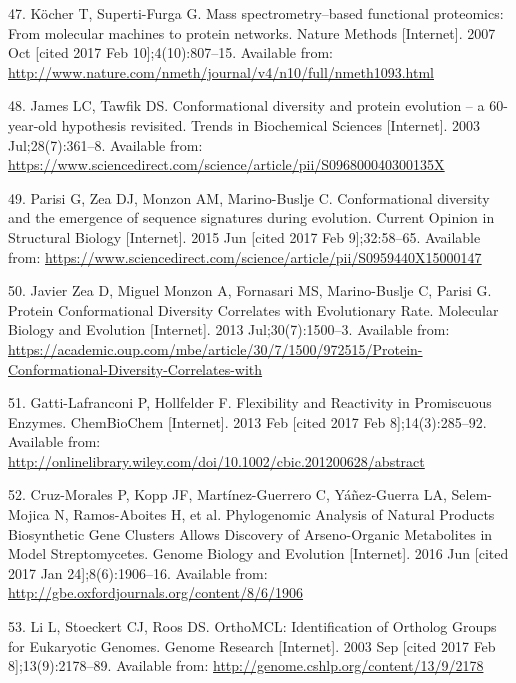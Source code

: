 \documentclass[12pt,twoside]{reedthesis}
\begin{document}
{  \hypertarget{ref-kocher_mass_2007}{}
  47. Köcher T, Superti-Furga G. Mass spectrometry--based functional
  proteomics: From molecular machines to protein networks. Nature Methods
  {[}Internet{]}. 2007 Oct {[}cited 2017 Feb 10{]};4(10):807--15.
  Available from:
  \url{http://www.nature.com/nmeth/journal/v4/n10/full/nmeth1093.html}
  
  \hypertarget{ref-james_conformational_2003}{}
  48. James LC, Tawfik DS. Conformational diversity and protein evolution
  -- a 60-year-old hypothesis revisited. Trends in Biochemical Sciences
  {[}Internet{]}. 2003 Jul;28(7):361--8. Available from:
  \url{https://www.sciencedirect.com/science/article/pii/S096800040300135X}
  
  \hypertarget{ref-parisi_conformational_2015}{}
  49. Parisi G, Zea DJ, Monzon AM, Marino-Buslje C. Conformational
  diversity and the emergence of sequence signatures during evolution.
  Current Opinion in Structural Biology {[}Internet{]}. 2015 Jun {[}cited
  2017 Feb 9{]};32:58--65. Available from:
  \url{https://www.sciencedirect.com/science/article/pii/S0959440X15000147}
  
  \hypertarget{ref-javier_zea_protein_2013}{}
  50. Javier Zea D, Miguel Monzon A, Fornasari MS, Marino-Buslje C, Parisi
  G. Protein Conformational Diversity Correlates with Evolutionary Rate.
  Molecular Biology and Evolution {[}Internet{]}. 2013 Jul;30(7):1500--3.
  Available from:
  \url{https://academic.oup.com/mbe/article/30/7/1500/972515/Protein-Conformational-Diversity-Correlates-with}
  
  \hypertarget{ref-gatti-lafranconi_flexibility_2013}{}
  51. Gatti-Lafranconi P, Hollfelder F. Flexibility and Reactivity in
  Promiscuous Enzymes. ChemBioChem {[}Internet{]}. 2013 Feb {[}cited 2017
  Feb 8{]};14(3):285--92. Available from:
  \url{http://onlinelibrary.wiley.com/doi/10.1002/cbic.201200628/abstract}
  
  \hypertarget{ref-cruz-morales_phylogenomic_2016}{}
  52. Cruz-Morales P, Kopp JF, Martínez-Guerrero C, Yáñez-Guerra LA,
  Selem-Mojica N, Ramos-Aboites H, et al. Phylogenomic Analysis of Natural
  Products Biosynthetic Gene Clusters Allows Discovery of Arseno-Organic
  Metabolites in Model Streptomycetes. Genome Biology and Evolution
  {[}Internet{]}. 2016 Jun {[}cited 2017 Jan 24{]};8(6):1906--16.
  Available from: \url{http://gbe.oxfordjournals.org/content/8/6/1906}
  
  \hypertarget{ref-li_orthomcl_2003}{}
  53. Li L, Stoeckert CJ, Roos DS. OrthoMCL: Identification of Ortholog
  Groups for Eukaryotic Genomes. Genome Research {[}Internet{]}. 2003 Sep
  {[}cited 2017 Feb 8{]};13(9):2178--89. Available from:
  \url{http://genome.cshlp.org/content/13/9/2178}
  
}
\end{document}
